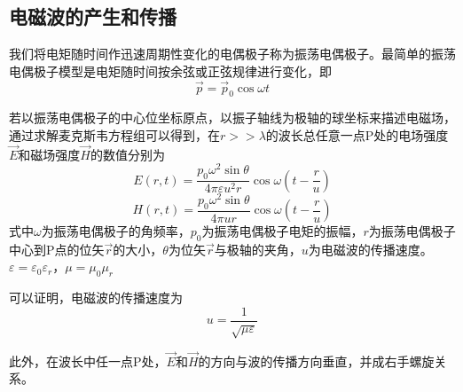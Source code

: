 \documentclass[12pt]{article}
\begin{document}
\subsection{电磁波的产生和传播}

我们将电矩随时间作迅速周期性变化的电偶极子称为振荡电偶极子。最简单的振荡电偶极子模型是电矩随时间按余弦或正弦规律进行变化，即
\begin{equation*}
    \overrightarrow{p} = \overrightarrow{p}_0 \cos \omega t
\end{equation*}

若以振荡电偶极子的中心位坐标原点，以振子轴线为极轴的球坐标来描述电磁场，通过求解麦克斯韦方程组可以得到，在\(r >> \lambda\)的波长总任意一点P处的电场强度\(\overrightarrow{E}\)和磁场强度\(\overrightarrow{H}\)的数值分别为
\begin{equation}
    E(r, t)=\frac{p_0 \omega^2 \sin \theta}{4 \pi \varepsilon u^2 r} \cos \omega\left(t-\frac{r}{u}\right)
\end{equation}
\begin{equation}
    H(r, t)=\frac{p_0 \omega^2 \sin \theta}{4 \pi u r} \cos \omega\left(t-\frac{r}{u}\right)
\end{equation}
式中\(\omega\)为振荡电偶极子的角频率，\(p_0\)为振荡电偶极子电矩的振幅，\(r\)为振荡电偶极子中心到P点的位矢\(\overrightarrow{r}\)的大小，\(\theta\)为位矢\(\overrightarrow{r}\)与极轴的夹角，\(u\)为电磁波的传播速度。\(\varepsilon = \varepsilon_0 \varepsilon_r\)，\(\mu = \mu_0 \mu_r\)

可以证明，电磁波的传播速度为
\begin{equation}
    u = \frac{1}{\sqrt{\mu \varepsilon}}
\end{equation}

此外，在波长中任一点P处，\(\overrightarrow{E}\)和\(\overrightarrow{H}\)的方向与波的传播方向垂直，并成右手螺旋关系。
\end{document}
